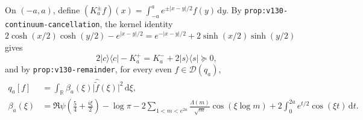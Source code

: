 \documentclass[11pt]{article}
\theoremstyle{remark}
\newcommand{\dd}{\mathrm d}
\begin{document}
On $(-a,a)$, define $(K_a^\pm f)(x) = \int_{-a}^a e^{\pm|x-y|/2}f(y)\,\dd y$. By \texttt{prop:v130-continuum-cancellation}, the kernel identity $2\cosh(x/2)\cosh(y/2) - e^{|x-y|/2} = e^{-|x-y|/2} + 2\sinh(x/2)\sinh(y/2)$ gives
\begin{equation}\label{eq:continuum-cancel}
  2|c\rangle\langle c| - K_a^+ = K_a^- + 2|s\rangle\langle s| \succeq 0,
\end{equation}
and by \texttt{prop:v130-remainder}, for every even $f \in \mathcal{D}(q_a)$,
\begin{align}\label{eq:beta-symbol}
  q_a[f] &= \int_{\mathbb{R}} \beta_a(\xi)\bigl|\widehat{\widetilde{f}}(\xi)\bigr|^2\,\dd\xi, \\
  \beta_a(\xi) &= \Re\psi\!\left(\frac{5}{4} + \frac{i\xi}{2}\right) - \log\pi - 2\sum_{1 < m < e^{2a}} \frac{\Lambda(m)}{\sqrt{m}}\cos(\xi\log m) + 2\int_0^{2a} e^{t/2}\cos(\xi t)\,\dd t.\nonumber
\end{align}
\end{document}
